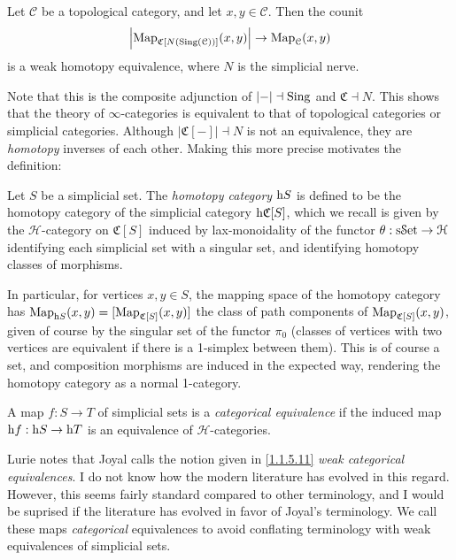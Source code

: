 \begin{theorem}\label{1.1.5.9}
	Let $\mathcal{C} $ be a topological category, and let $x,y\in \mathcal{C} $. Then the counit
	\[
		\left| \operatorname{Map}_{\mathfrak{C} [N(\operatorname{Sing}(\mathcal{C}) )]} (x,y) \right| \to \operatorname{Map}_\mathcal{C} (x,y)
	\]
	is a weak homotopy equivalence, where $N$ is the simplicial nerve.
\end{theorem}

Note that this is the composite adjunction of $\left| - \right| \dashv \operatorname{Sing}$ and $\mathfrak{C} \dashv N$. This shows that the theory of $\infty $-categories is equivalent to that of topological categories or simplicial categories. Although $\left| \mathfrak{C} [-] \right| \dashv N$ is not an equivalence, they are \emph{homotopy} inverses of each other. Making this more precise motivates the definition:

\begin{definition}\label{1.1.5.10}
	Let $S$ be a simplicial set. The \emph{homotopy category} $\mathrm{h} S$ is defined to be the homotopy category of the simplicial category $\mathrm{h} \mathfrak{C} [S]$, which we recall is given by the $\mathcal{H} $-category on $\mathfrak{C} [S]$ induced by lax-monoidality of the functor $\theta :\mathrm{s}\mathcal{S}\mathrm{et} \to \mathcal{H} $ identifying each simplicial set with a singular set, and identifying homotopy classes of morphisms.
\end{definition}

In particular, for vertices $x,y\in S$, the mapping space of the homotopy category has $\operatorname{Map}_{\mathrm{h} S} (x,y)=[\operatorname{Map}_{\mathfrak{C} [S]} (x,y)]$ the class of path components of $\operatorname{Map}_{\mathfrak{C} [S]} (x,y)$, given of course by the singular set of the functor $\pi _0$ (classes of vertices with two vertices are equivalent if there is a 1-simplex between them). This is of course a set, and composition morphisms are induced in the expected way, rendering the homotopy category as a normal 1-category.

\begin{definition}\label{1.1.5.11}
	A map $f : S \to T$ of simplicial sets is a \emph{categorical equivalence} if the induced map $\mathrm{h} f : \mathrm{h} S \to \mathrm{h} T$ is an equivalence of $\mathcal{H} $-categories.
\end{definition}

Lurie notes that Joyal calls the notion given in \cref{1.1.5.11} \emph{weak categorical equivalences}. I do not know how the modern literature has evolved in this regard. However, this seems fairly standard compared to other terminology, and I would be suprised if the literature has evolved in favor of Joyal's terminology. We call these maps \emph{categorical} equivalences to avoid conflating terminology with weak equivalences of simplicial sets.

